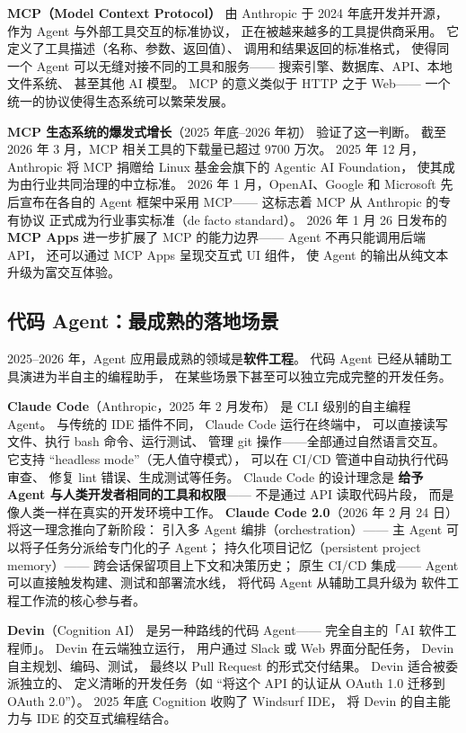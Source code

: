\textbf{MCP（Model Context Protocol）}
由 Anthropic 于 2024 年底开发并开源，
作为 Agent 与外部工具交互的标准协议，
正在被越来越多的工具提供商采用。
它定义了工具描述（名称、参数、返回值）、
调用和结果返回的标准格式，
使得同一个 Agent 可以无缝对接不同的工具和服务——
搜索引擎、数据库、API、本地文件系统、
甚至其他 AI 模型。
MCP 的意义类似于 HTTP 之于 Web——
一个统一的协议使得生态系统可以繁荣发展。

\textbf{MCP 生态系统的爆发式增长}（2025 年底--2026 年初）
验证了这一判断。
截至 2026 年 3 月，MCP 相关工具的下载量已超过 9700 万次。
2025 年 12 月，Anthropic 将 MCP 捐赠给
Linux 基金会旗下的 Agentic AI Foundation，
使其成为由行业共同治理的中立标准。
2026 年 1 月，OpenAI、Google 和 Microsoft
先后宣布在各自的 Agent 框架中采用 MCP——
这标志着 MCP 从 Anthropic 的专有协议
正式成为行业事实标准（de facto standard）。
2026 年 1 月 26 日发布的 \textbf{MCP Apps}
进一步扩展了 MCP 的能力边界——
Agent 不再只能调用后端 API，
还可以通过 MCP Apps 呈现交互式 UI 组件，
使 Agent 的输出从纯文本升级为富交互体验。

\subsection{代码 Agent：最成熟的落地场景}
\label{sec:code-agents}

2025--2026 年，Agent 应用最成熟的领域是\textbf{软件工程}。
代码 Agent 已经从辅助工具演进为半自主的编程助手，
在某些场景下甚至可以独立完成完整的开发任务。

\textbf{Claude Code}（Anthropic，2025 年 2 月发布）
是 CLI 级别的自主编程 Agent。
与传统的 IDE 插件不同，
Claude Code 运行在终端中，
可以直接读写文件、执行 bash 命令、运行测试、
管理 git 操作——全部通过自然语言交互。
它支持 ``headless mode''（无人值守模式），
可以在 CI/CD 管道中自动执行代码审查、
修复 lint 错误、生成测试等任务。
Claude Code 的设计理念是
\textbf{给予 Agent 与人类开发者相同的工具和权限}——
不是通过 API 读取代码片段，
而是像人类一样在真实的开发环境中工作。
\textbf{Claude Code 2.0}（2026 年 2 月 24 日）
将这一理念推向了新阶段：
引入多 Agent 编排（orchestration）——
主 Agent 可以将子任务分派给专门化的子 Agent；
持久化项目记忆（persistent project memory）——
跨会话保留项目上下文和决策历史；
原生 CI/CD 集成——
Agent 可以直接触发构建、测试和部署流水线，
将代码 Agent 从辅助工具升级为
软件工程工作流的核心参与者。

\textbf{Devin}（Cognition AI）
是另一种路线的代码 Agent——
完全自主的「AI 软件工程师」。
Devin 在云端独立运行，
用户通过 Slack 或 Web 界面分配任务，
Devin 自主规划、编码、测试，
最终以 Pull Request 的形式交付结果。
Devin 适合被委派独立的、
定义清晰的开发任务（如 ``将这个 API 的认证从 OAuth 1.0 迁移到 OAuth 2.0''）。
2025 年底 Cognition 收购了 Windsurf IDE，
将 Devin 的自主能力与 IDE 的交互式编程结合。

